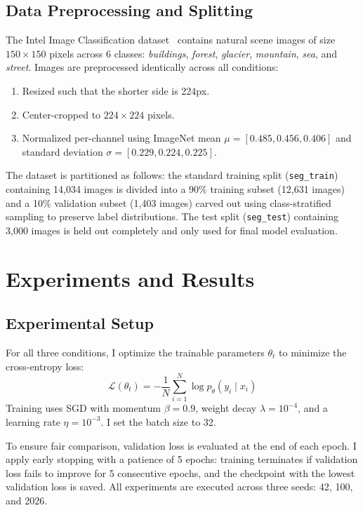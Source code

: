 \documentclass[conference]{IEEEtran}
\begin{document}
\subsection{Data Preprocessing and Splitting}
The Intel Image Classification dataset~\cite{intelclassification} contains natural scene images of size $150 \times 150$ pixels across 6 classes: \textit{buildings}, \textit{forest}, \textit{glacier}, \textit{mountain}, \textit{sea}, and \textit{street}.
Images are preprocessed identically across all conditions:
\begin{enumerate}
    \item Resized such that the shorter side is 224px.
    \item Center-cropped to $224 \times 224$ pixels.
    \item Normalized per-channel using ImageNet mean $\mu = [0.485, 0.456, 0.406]$ and standard deviation $\sigma = [0.229, 0.224, 0.225]$.
\end{enumerate}

The dataset is partitioned as follows: the standard training split (\texttt{seg\_train}) containing 14,034 images is divided into a 90\% training subset (12,631 images) and a 10\% validation subset (1,403 images) carved out using class-stratified sampling to preserve label distributions. The test split (\texttt{seg\_test}) containing 3,000 images is held out completely and only used for final model evaluation.

\section{Experiments and Results}

\subsection{Experimental Setup}
For all three conditions, I optimize the trainable parameters $\theta_t$ to minimize the cross-entropy loss:
\begin{equation}
\mathcal{L}(\theta_t) = -\frac{1}{N} \sum_{i=1}^N \log p_\theta(y_i \mid x_i)
\end{equation}
Training uses SGD with momentum $\beta = 0.9$, weight decay $\lambda = 10^{-4}$, and a learning rate $\eta = 10^{-3}$. I set the batch size to 32.

To ensure fair comparison, validation loss is evaluated at the end of each epoch. I apply early stopping with a patience of 5 epochs: training terminates if validation loss fails to improve for 5 consecutive epochs, and the checkpoint with the lowest validation loss is saved. All experiments are executed across three seeds: 42, 100, and 2026.
\end{document}
